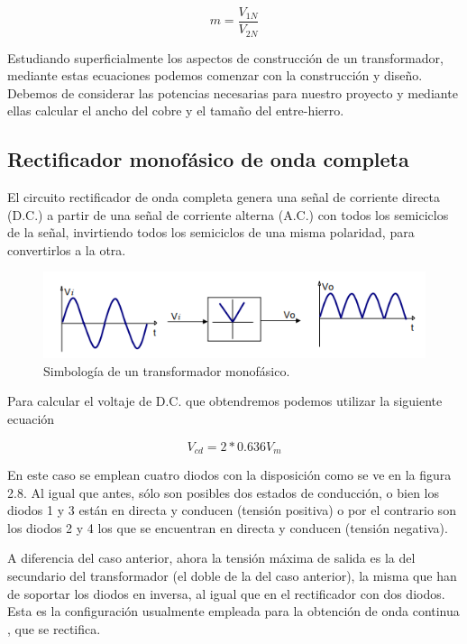 \begin{equation}\label{eq:ej}
m=\dfrac{V_{1N}}{V_{2N}}
\end{equation}

Estudiando superficialmente los aspectos de construcción de un transformador, mediante estas ecuaciones podemos comenzar con la construcción y diseño. Debemos de considerar las potencias necesarias para nuestro proyecto y mediante ellas calcular el ancho del cobre y el tamaño del entre-hierro.\cite{transformador}

\subsection{Rectificador monofásico de onda completa}

El circuito rectificador de onda completa genera una señal de corriente directa (D.C.) a partir de una señal de corriente alterna
(A.C.) con todos los semiciclos de la señal, invirtiendo todos los semiciclos de una misma polaridad, para convertirlos a la otra. 

\begin{figure}[H]
\centering
\includegraphics[width=12cm]{capitulo3/figs/puente.png}
\caption{ Simbología de un transformador monofásico.}
\end{figure}

Para calcular el voltaje de D.C. que obtendremos podemos utilizar la siguiente ecuación\cite{rectificador}


\begin{equation}\label{eq:ej}
V_{cd}=2*0.636V_{m}
\end{equation}

En este caso se emplean cuatro diodos con la disposición como se ve en la figura 2.8. Al igual que antes, sólo son posibles dos estados de conducción, o bien los diodos 1 y 3 están en directa y conducen (tensión positiva) o por el contrario son los diodos 2 y 4 los que se encuentran en directa y conducen (tensión negativa).

A diferencia del caso anterior, ahora la tensión máxima de salida es la del secundario del transformador (el doble de la del caso anterior), la misma que han de soportar los diodos en inversa, al igual que en el rectificador con dos diodos. Esta es la configuración usualmente empleada para la obtención de onda continua , que se rectifica.

